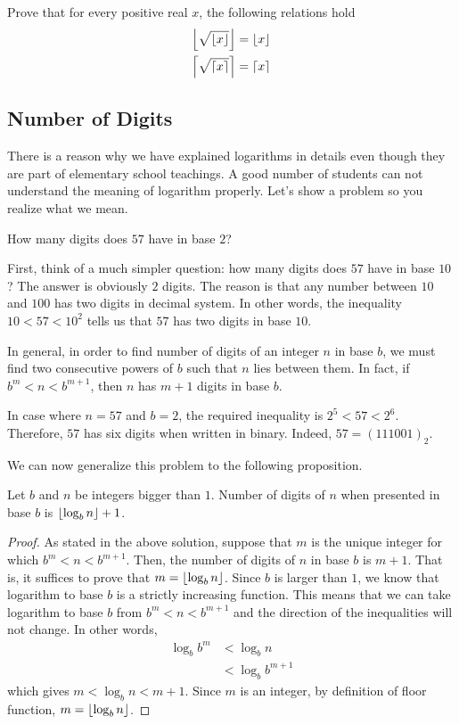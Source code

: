 \begin{problem}
Prove that for every positive real $x$, the following relations hold
\begin{align*}
	\left\lfloor{\sqrt {\left\lfloor{x}\right\rfloor}}\right\rfloor&= \left\lfloor{x}\right\rfloor\\
	\left\lceil \sqrt{ \lceil x \rceil} \right\rceil  &= \lceil x \rceil
\end{align*}
\end{problem}


\subsection{Number of Digits}
There is a reason why we have explained logarithms in details even though they are part of elementary school teachings. A good number of students can not understand the meaning of logarithm properly. Let's show a problem so you realize what we mean.
\begin{question}
	How many digits does $57$ have in base $2$?
\end{question}

\begin{solution}
	First, think of a much simpler question: how many digits does $57$ have in base $10$? The answer is obviously $2$ digits. The reason is that any number between $10$ and $100$ has two digits in decimal system. In other words, the inequality $10<57<10^2$ tells us that $57$ has two digits in base $10$.

	In general, in order to find number of digits of an integer $n$ in base $b$, we must find two consecutive powers of $b$ such that $n$ lies between them. In fact, if $b^m < n <b^{m+1}$, then $n$ has $m+1$ digits in base $b$.

	In case where $n=57$ and $b=2$, the required inequality is $2^5 < 57 <2^6$. Therefore, $57$ has six digits when written in binary. Indeed, $57 = (111001)_2$.
\end{solution}
We can now generalize this problem to the following proposition.
\begin{proposition}
	Let $b$ and $n$ be integers bigger than $1$. Number of digits of $n$ when presented in base $b$ is $\left\lfloor{\log_b n}\right\rfloor+1$.
\end{proposition}

\begin{proof}
	As stated in the above solution, suppose that $m$ is the unique integer for which $b^m < n <b^{m+1}$. Then, the number of digits of $n$ in base $b$ is $m+1$. That is, it suffices to prove that $m=\left\lfloor{\log_b n}\right\rfloor$. Since $b$ is larger than $1$, we know that logarithm to base $b$ is a strictly increasing function. This means that we can take logarithm to base $b$ from $b^m < n <b^{m+1}$ and the direction of the inequalities will not change. In other words,
		\begin{align*}
			\log_b b^m
				& < \log_b n\\
				& < \log_b b^{m+1}
		\end{align*}
	which gives $m<\log_b n<m+1$. Since $m$ is an integer, by definition of floor function, $m=\left\lfloor{\log_b n}\right\rfloor$.
\end{proof}
